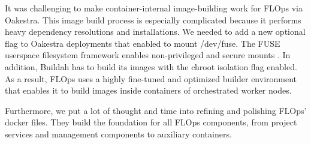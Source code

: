 It was challenging to make container-internal image-building work for FLOps via Oakestra.
This image build process is especially complicated because it performs heavy dependency resolutions and installations.
We needed to add a new optional flag to Oakestra deployments that enabled to mount /dev/fuse.
The FUSE userspace filesystem framework enables non-privileged and secure mounts \cite{docs:fuse_linux_kernel}.
In addition, Buildah has to build its images with the chroot isolation flag enabled.
As a result, FLOps uses a highly fine-tuned and optimized builder environment that enables it to build images inside containers of orchestrated worker nodes.

Furthermore, we put a lot of thought and time into refining and polishing FLOps' docker files.
They build the foundation for all FLOps components, from project services and management components to auxiliary containers.